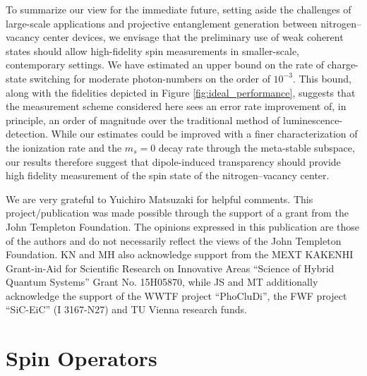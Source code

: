 \documentclass[aps,pra,amsmath,amssymb,reprint,superscriptaddress,tightenlines]{revtex4-1}
\begin{document}
To summarize our view for the immediate future, setting aside the challenges of large-scale applications and projective entanglement generation between nitrogen--vacancy center devices, we envisage that the preliminary use of weak coherent states should allow high-fidelity spin measurements in smaller-scale, contemporary settings. We have estimated an upper bound on the rate of charge-state switching for moderate photon-numbers on the order of $10^{-3}$. This bound, along with the fidelities depicted in Figure \ref{fig:ideal_performance}, suggests that the measurement scheme considered here sees an error rate improvement of, in principle, an order of magnitude over the traditional method of luminescence-detection. While our estimates could be improved with a finer characterization of the ionization rate and the $m_{s}=0$ decay rate through the meta-stable subspace, our results therefore suggest that dipole-induced transparency should provide high fidelity measurement of the spin state of the nitrogen--vacancy center.





\begin{acknowledgments}
We are very grateful to Yuichiro Matsuzaki for helpful comments. This project/publication was made possible through the support of a grant from the John Templeton Foundation. The opinions expressed in this publication are those of the authors and do not necessarily reflect the views of the John Templeton Foundation. KN and MH also acknowledge support from the MEXT KAKENHI Grant-in-Aid for Scientific Research on Innovative Areas “Science of Hybrid Quantum Systems” Grant No. 15H05870, while JS and MT additionally acknowledge the support of the WWTF project ``PhoCluDi'', the FWF project ``SiC-EiC'' (I 3167-N27) and TU Vienna research funds.
\end{acknowledgments}




\appendix
\section{Spin Operators} 
\label{sec:spin_operators}
\end{document}
